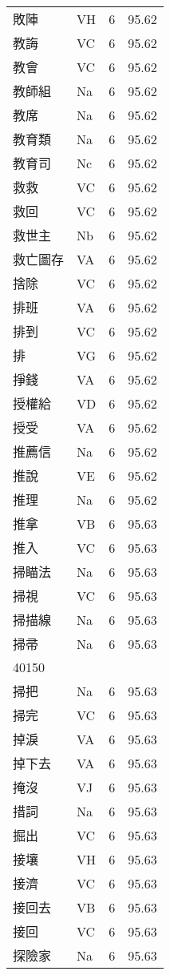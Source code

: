 \documentclass[twocolumn]{book}
\begin{document}
\begin{supertabular}{llrr}
敗陣 & VH & 6 &  95.62\\
教誨 & VC & 6 &  95.62\\
教會 & VC & 6 &  95.62\\
教師組 & Na & 6 &  95.62\\
教席 & Na & 6 &  95.62\\
教育類 & Na & 6 &  95.62\\
教育司 & Nc & 6 &  95.62\\
救救 & VC & 6 &  95.62\\
救回 & VC & 6 &  95.62\\
救世主 & Nb & 6 &  95.62\\
救亡圖存 & VA & 6 &  95.62\\
捨除 & VC & 6 &  95.62\\
排班 & VA & 6 &  95.62\\
排到 & VC & 6 &  95.62\\
排 & VG & 6 &  95.62\\
掙錢 & VA & 6 &  95.62\\
授權給 & VD & 6 &  95.62\\
授受 & VA & 6 &  95.62\\
推薦信 & Na & 6 &  95.62\\
推說 & VE & 6 &  95.62\\
推理 & Na & 6 &  95.62\\
推拿 & VB & 6 &  95.63\\
推入 & VC & 6 &  95.63\\
掃瞄法 & Na & 6 &  95.63\\
掃視 & VC & 6 &  95.63\\
掃描線 & Na & 6 &  95.63\\
掃帚 & Na & 6 &  95.63\\
40150\\
掃把 & Na & 6 &  95.63\\
掃完 & VC & 6 &  95.63\\
掉淚 & VA & 6 &  95.63\\
掉下去 & VA & 6 &  95.63\\
掩沒 & VJ & 6 &  95.63\\
措詞 & Na & 6 &  95.63\\
掘出 & VC & 6 &  95.63\\
接壤 & VH & 6 &  95.63\\
接濟 & VC & 6 &  95.63\\
接回去 & VB & 6 &  95.63\\
接回 & VC & 6 &  95.63\\
探險家 & Na & 6 &  95.63\\

\end{supertabular}
\end{document}
